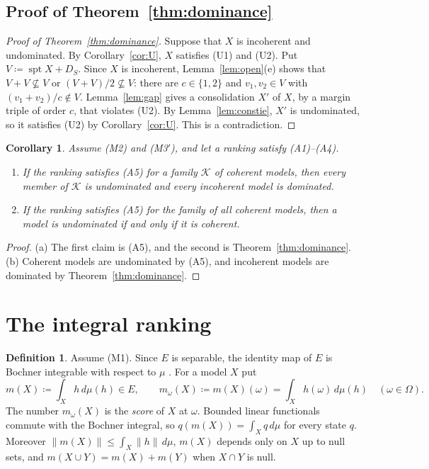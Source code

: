 \documentclass[11pt]{article}
\DeclareMathOperator{\spt}{spt}
\theoremstyle{plain}
\newtheorem{corollary}[theorem]{Corollary}
\theoremstyle{definition}
\newtheorem{definition}[theorem]{Definition}
\theoremstyle{remark}
\begin{document}
\subsection{Proof of Theorem~\ref{thm:dominance}}\label{sec:proof}

\begin{proof}[Proof of Theorem~\ref{thm:dominance}]
Suppose that $X$ is incoherent and undominated. By Corollary~\ref{cor:U}, $X$ satisfies (U1)
and (U2). Put $V\coloneqq\spt X+D_S$. Since $X$ is incoherent, Lemma~\ref{lem:open}(e) shows that
$V+V\not\subseteq V$ or $(V+V)/2\not\subseteq V$: there are $c\in\{1,2\}$ and $v_1,v_2\in V$
with $(v_1+v_2)/c\notin V$. Lemma~\ref{lem:gap} gives a consolidation $X'$ of $X$, by a margin
triple of order $c$, that violates (U2). By Lemma~\ref{lem:constie}, $X'$ is undominated, so it
satisfies (U2) by Corollary~\ref{cor:U}. This is a contradiction.
\end{proof}

\begin{corollary}\label{cor:admissible}
Assume (M2) and (M3$'$), and let a ranking satisfy (A1)--(A4).
\begin{enumerate}[label=(\alph*)]
  \item If the ranking satisfies (A5) for a family $\mathcal K$ of coherent models, then every
  member of $\mathcal K$ is undominated and every incoherent model is dominated.
  \item If the ranking satisfies (A5) for the family of all coherent models, then a model is
  undominated if and only if it is coherent.
\end{enumerate}
\end{corollary}

\begin{proof}
(a) The first claim is (A5), and the second is Theorem~\ref{thm:dominance}. (b) Coherent
models are undominated by (A5), and incoherent models are dominated by
Theorem~\ref{thm:dominance}.
\end{proof}

\section{The integral ranking}\label{sec:integral}

\begin{definition}\label{def:score}
Assume (M1). Since $E$ is separable, the identity map of $E$ is Bochner integrable with respect
to $\mu$ \cite{DiestelUhl}. For a model $X$ put
\[
  m(X)\coloneqq\int_Xh\,d\mu(h)\in E,\qquad m_\omega(X)\coloneqq m(X)(\omega)=
  \int_Xh(\omega)\,d\mu(h)\quad(\omega\in\Omega).
\]
The number $m_\omega(X)$ is the \emph{score} of $X$ at $\omega$. Bounded linear functionals
commute with the Bochner integral, so $q(m(X))=\int_Xq\,d\mu$ for every state $q$. Moreover
$\|m(X)\|\le\int_X\|h\|\,d\mu$, $m(X)$ depends only on $X$ up to null sets, and
$m(X\cup Y)=m(X)+m(Y)$ when $X\cap Y$ is null.
\end{definition}
\end{document}
